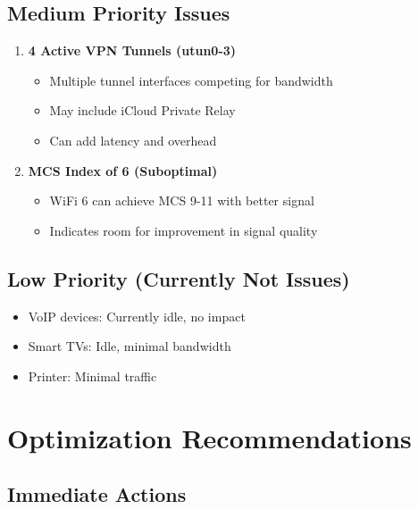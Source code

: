 \documentclass[11pt,letterpaper]{article}
\begin{document}
\subsection{Medium Priority Issues}

\begin{enumerate}
    \item \textbf{4 Active VPN Tunnels (utun0-3)}
    \begin{itemize}
        \item Multiple tunnel interfaces competing for bandwidth
        \item May include iCloud Private Relay
        \item Can add latency and overhead
    \end{itemize}

    \item \textbf{MCS Index of 6 (Suboptimal)}
    \begin{itemize}
        \item WiFi 6 can achieve MCS 9-11 with better signal
        \item Indicates room for improvement in signal quality
    \end{itemize}
\end{enumerate}

\subsection{Low Priority (Currently Not Issues)}

\begin{itemize}
    \item VoIP devices: Currently idle, no impact
    \item Smart TVs: Idle, minimal bandwidth
    \item Printer: Minimal traffic
\end{itemize}

\section{Optimization Recommendations}

\subsection{Immediate Actions}
\end{document}
